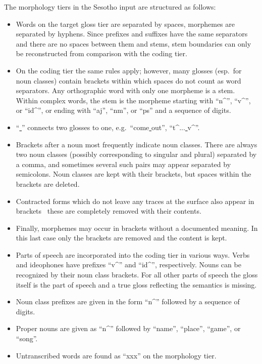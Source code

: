\documentclass[a4paper, 11pt]{book}
\newcommand{\und}{\underline{{ }}\hspace{0.2mm}}	%
\begin{document}
The morphology tiers in the Sesotho input are structured as follows: 

\begin{itemize}
	\item Words on the target gloss tier are separated by spaces, morphemes are separated by hyphens. Since prefixes and suffixes have the same separators
		and there are no spaces between them and stems, stem boundaries can only be reconstructed from comparison with the coding tier. 
	\item On the coding tier the same rules apply; however, many glosses (esp.\ for noun classes) contain brackets within which spaces do not count
		as word separators. Any orthographic word with only one morpheme is a stem. Within complex words, the stem is the morpheme starting with
		“n\^{}”, “v\^{}”, or “id\^{}”, or ending with “aj”, “nm”, or “ps” and a sequence of digits. 
	\item “\und” connects two glosses to one, e.g.\ “come\und out”, “t\^{}...\und v\^{}”. %
	\item Brackets after a noun most frequently indicate noun classes. There are always two noun classes (possibly corresponding to singular
		and plural) separated by a comma, and sometimes several such pairs may appear separated by semicolons. 
		Noun classes are kept with their brackets, but spaces within the brackets are deleted. 
	\item Contracted forms which do not leave any traces at the surface also appear in brackets \textendash\ these are completely removed with their contents. 
	\item Finally, morphemes may occur in brackets without a documented meaning. In this last case only the brackets are removed and the content is kept. 
	\item Parts of speech are incorporated into the coding tier in various ways. Verbs and ideophones have prefixes “v\^{}” and “id\^{}”, respectively. 
		Nouns can be recognized by their noun class brackets. For all other parts of speech the gloss itself is the part of speech and a true
		gloss reflecting the semantics is missing. %
	\item Noun class prefixes are given in the form “n\^{}” followed by a sequence of digits. %
	\item Proper nouns are given as “n\^{}” followed by “name”, “place”, “game”, or “song”. 
	\item Untranscribed words are found as “xxx” on the morphology tier. 
\end{itemize}
\end{document}
